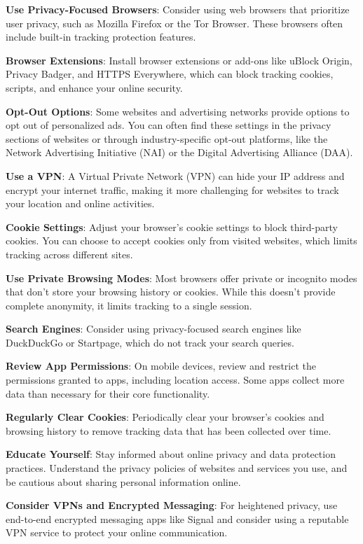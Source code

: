 \documentclass[
]{book}
\theoremstyle{definition}
\theoremstyle{definition}
\theoremstyle{definition}
\theoremstyle{definition}
\theoremstyle{remark}
\begin{document}
\textbf{Use Privacy-Focused Browsers}: Consider using web browsers that prioritize user privacy, such as Mozilla Firefox or the Tor Browser. These browsers often include built-in tracking protection features.

\textbf{Browser Extensions}: Install browser extensions or add-ons like uBlock Origin, Privacy Badger, and HTTPS Everywhere, which can block tracking cookies, scripts, and enhance your online security.

\textbf{Opt-Out Options}: Some websites and advertising networks provide options to opt out of personalized ads. You can often find these settings in the privacy sections of websites or through industry-specific opt-out platforms, like the Network Advertising Initiative (NAI) or the Digital Advertising Alliance (DAA).

\textbf{Use a VPN}: A Virtual Private Network (VPN) can hide your IP address and encrypt your internet traffic, making it more challenging for websites to track your location and online activities.

\textbf{Cookie Settings}: Adjust your browser's cookie settings to block third-party cookies. You can choose to accept cookies only from visited websites, which limits tracking across different sites.

\textbf{Use Private Browsing Modes}: Most browsers offer private or incognito modes that don't store your browsing history or cookies. While this doesn't provide complete anonymity, it limits tracking to a single session.

\textbf{Search Engines}: Consider using privacy-focused search engines like DuckDuckGo or Startpage, which do not track your search queries.

\textbf{Review App Permissions}: On mobile devices, review and restrict the permissions granted to apps, including location access. Some apps collect more data than necessary for their core functionality.

\textbf{Regularly Clear Cookies}: Periodically clear your browser's cookies and browsing history to remove tracking data that has been collected over time.

\textbf{Educate Yourself}: Stay informed about online privacy and data protection practices. Understand the privacy policies of websites and services you use, and be cautious about sharing personal information online.

\textbf{Consider VPNs and Encrypted Messaging}: For heightened privacy, use end-to-end encrypted messaging apps like Signal and consider using a reputable VPN service to protect your online communication.
\end{document}
